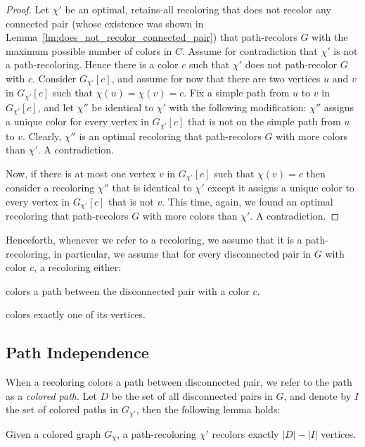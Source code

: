 \begin{proof}
Let $\chi'$ be an optimal, 
retains-all recoloring that does not recolor any connected pair 
(whose existence was shown in Lemma~\ref{lm:does_not_recolor_connected_pair}) 
that path-recolors $G$ with the maximum possible number of colors in $C$. 
%
Assume for contradiction that $\chi'$ is not a path-recoloring.  
%
Hence there is a color $c$ such that $\chi'$ does not path-recolor $G$ with $c$.
%
Consider $G_{\chi'}[c]$, 
and assume for now that there are two vertices $u$
and $v$ in $G_{\chi'}[c]$ such that $\chi(u) = \chi(v) = c$.  
%
Fix a simple path from $u$ to $v$ in $G_{\chi'}[c]$, 
and let $\chi''$ be identical to $\chi'$ with the following modification: 
$\chi''$ assigns a unique color for every vertex in $G_{\chi'}[c]$ 
that is not on the simple path from $u$ to $v$.
%
Clearly, 
$\chi''$ is an optimal recoloring that path-recolors $G$ with more colors than $\chi'$.  
%
A contradiction.
	
Now,
if there is at most one vertex $v$ in $G_{\chi'}[c]$ such that $\chi(v) = c$ 
then consider a recoloring $\chi''$ that is identical to $\chi'$ 
except it assigns a unique color to every vertex in $G_{\chi'}[c]$ that is not $v$.
%
This time, 
again, 
we found an optimal recoloring that path-recolors $G$ with more colors than $\chi'$.  
%
A contradiction.
\end{proof}

Henceforth, 
whenever we refer to a recoloring, 
we assume that it is a path-recoloring, 
in particular, 
we assume that for every disconnected pair in $G$ with color $c$, 
a recoloring either:
\begin{inparaenum}[(i)]
	\item colors a path between the disconnected pair with a color $c$.
	\item colors exactly one of its vertices. 
\end{inparaenum}

\subsection{Path Independence}

When a recoloring colors a path between disconnected pair, 
we refer to the path as a \emph{colored path}.
%
Let $D$ be the set of all disconnected pairs in $G$, 
and denote by $I$ the set of colored paths in $G_{\chi'}$, 
then the following lemma holds:

\begin{lemma}
\label{lm:cost}
Given a colored graph $G_\chi$, 
a path-recoloring $\chi'$ recolors exactly $|D| - |I|$ vertices.
\end{lemma}

